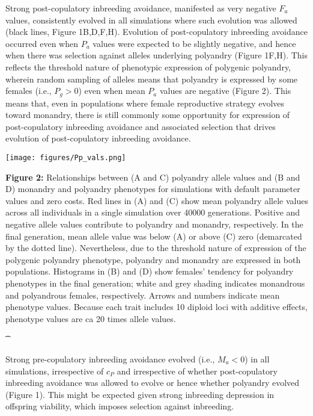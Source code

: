 \documentclass[10pt,letterpaper]{article}
\begin{document}
Strong post-copulatory inbreeding avoidance, manifested as very negative $F_{a}$ values, consistently evolved in all simulations where such evolution was allowed (black lines, Figure 1B,D,F,H). Evolution of post-copulatory inbreeding avoidance occurred even when $P_{a}$ values were expected to be slightly negative, and hence when there was selection against alleles underlying polyandry (Figure 1F,H). This reflects the threshold nature of phenotypic expression of polygenic polyandry, wherein random sampling of alleles means that polyandry is expressed by some females (i.e., $P_{g}>0$) even when mean $P_{a}$ values are negative (Figure 2). This means that, even in populations where female reproductive strategy evolves toward monandry, there is still commonly some opportunity for expression of post-copulatory inbreeding avoidance and associated selection that drives evolution of post-copulatory inbreeding avoidance.

{\color{Gray}
\begin{adjustwidth}{-2.2in}{0in}
{
   \texttt{[image: figures/Pp\_vals.png]}%
}
{%
   \begin{justify}\vspace{0.75 mm} \textbf{Figure 2:} Relationships between (A and C) polyandry allele values and (B and D) monandry and polyandry phenotypes for simulations with default parameter values and zero costs. Red lines in (A) and (C) show mean polyandry allele values across all individuals in a single simulation over 40000 generations. Positive and negative allele values contribute to polyandry and monandry, respectively. In the final generation, mean allele value was below (A) or above (C) zero (demarcated by the dotted line). Nevertheless, due to the threshold nature of expression of the polygenic polyandry phenotype, polyandry and monandry are expressed in both populations. Histograms in (B) and (D) show females' tendency for polyandry phenotypes in the final generation; white and grey shading indicates monandrous and polyandrous females, respectively. Arrows and numbers indicate mean phenotype values. Because each trait includes 10 diploid loci with additive effects, phenotype values are ca 20 times allele values.  \end{justify}{\t}%
}
\end{adjustwidth}
}

Strong pre-copulatory inbreeding avoidance evolved (i.e., $M_{a}<0$) in all simulations, irrespective of $c_{P}$ and irrespective of whether post-copulatory inbreeding avoidance was allowed to evolve or hence whether polyandry evolved (Figure 1). This might be expected given strong inbreeding depression in offspring viability, which imposes selection against inbreeding.
\end{document}
